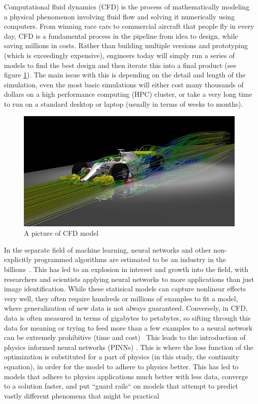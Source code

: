 \documentclass{article}
\begin{document}
\indent Computational fluid dynamics (CFD) is the process of
mathematically modeling a physical phenomenon involving fluid flow and solving
it numerically using computers\cite{SimScale}. From winning race cars to
commercial aircraft that people fly in every day, CFD is a fundamental process
in the pipeline from idea to design, while saving millions in costs. Rather
than building multiple versions and prototyping (which is exceedingly
expensive), engineers today will simply run a series of models to find the best
design and then iterate this into a final product (see figure
\ref{fig:CFD_Image}). The main issue with this is depending on the detail and
length of the simulation, even the most basic simulations will either cost many
thousands of dollars on a high performance computing (HPC) cluster, or take a
very long time to run on a standard desktop or laptop (usually in terms of
weeks to months).

\begin{figure}[h]
	\centering
	\includegraphics[scale=0.4]{./images/cfd.jpg}
	\caption{A picture of CFD model \cite{ANSYS.com}}
	\label{fig:CFD_Image}
\end{figure}

In the separate field of machine learning, neural networks and other
non-explicitly programmed algorithms are estimated to be an industry in the
billions~\cite{nn_history}. This has led to an explosion in interest and growth
into the field, with researchers and scientists applying neural networks to
more applications than just image identification. While these statisical models
can capture nonlinear effects very well, they often require hundreds or
millions of examples to fit a model, where generalization of new data is not
always guaranteed. Conversely, in CFD, data is often measured in terms of
gigabytes to petabytes, so sifting through this data for meaning or trying to
feed more than a few examples to a neural network can be extremely prohibitive
(time and cost)~\cite{DBLP:journals/corr/abs-1711-10566} This leads to the
introduction of physics informed neural networks (PINNs) \cite{PINN_History} .
This is where the loss function of the optimization is substituted for a part
of physics (in this study, the continuity equation), in order for the model to
adhere to physics better. This has led to models that adhere to physics
applications much better with less data, converge to a solution faster, and put
``guard rails`` on models that attempt to predict vastly different phenomena that
might be practical~\cite{DBLP:journals/corr/abs-1711-10561, raissi2018deepVIV}
\end{document}
